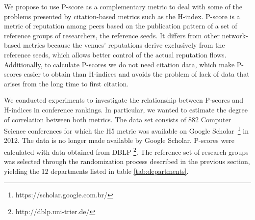 \documentclass[man]{apa6}
\begin{document}
We propose to use P-score as a complementary metric to deal with some of the problems
presented by citation-based metrics such as the H-index.
P-score is a metric of reputation among peers based on the publication pattern of a set of
reference groups of researchers, the reference seeds. It differs from other network-based 
metrics because the venues' reputations derive exclusively from the reference seeds, which 
allows better control of the actual reputation flows. Additionally, to calculate P-scores we 
do not need citation data, which make P-scores easier to obtain than H-indices and avoids 
the problem of lack of data that arises from the long time to first citation.

We conducted experiments to investigate the relationship between P-scores and H-indices
in conference rankings. In particular, we wanted to estimate the degree of correlation between both metrics. The data set consists of 882 Computer Science conferences
for which the H5 metric was available on Google Scholar~\footnote{https://scholar.google.com.br/}
in 2012. The data is no longer made available by Google Scholar. P-scores were calculated with
data obtained from DBLP \footnote{http://dblp.uni-trier.de/}. The reference set of research groups
was selected through the randomization process described in the previous section, 
yielding the 12 departments listed in table \ref{tab:departments}.
\end{document}
